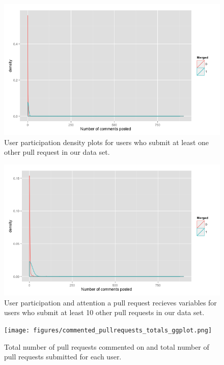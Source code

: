 \documentclass{iitthesis}
\begin{document}
\begin{figure}[p] \centering
\includegraphics[scale=0.6]{figures/number_comments_density_repeaters_ggplot.png}
\caption{User participation density plots for users who submit at least one
other pull request in our data set.} \label{fig:repeaters} \end{figure}

\begin{figure}[p] \centering
\includegraphics[scale=0.6]{figures/number_comments_density_repeaters_10_ggplot.png}
\caption{User participation and attention a pull request recieves variables for
users who submit at least 10 other pull requests in our data set.}
\label{fig:repeaters_10} \end{figure}

\begin{figure}[p] \centering
\texttt{[image: figures/commented\_pullrequests\_totals\_ggplot.png]}
\caption{Total number of pull requests commented on and total number of pull
requests submitted for each user.} \label{fig:commented_pullrequests_totals}
\end{figure}
\end{document}
